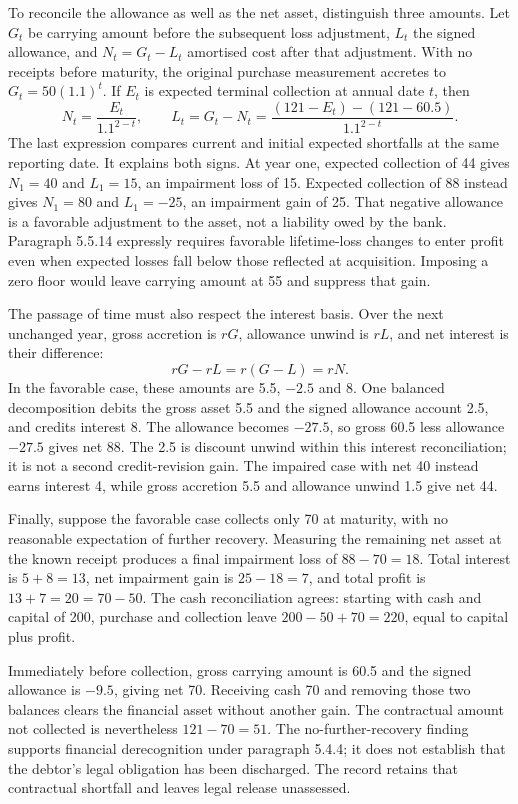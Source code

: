 To reconcile the allowance as well as the net asset, distinguish three
amounts. Let \(G_t\) be carrying amount before the subsequent loss
adjustment, \(L_t\) the signed allowance, and \(N_t=G_t-L_t\) amortised
cost after that adjustment. With no receipts before maturity, the original
purchase measurement accretes to \(G_t=50(1.1)^t\). If \(E_t\) is
expected terminal collection at annual date \(t\), then
\[
 N_t=\frac{E_t}{1.1^{2-t}},\qquad
 L_t=G_t-N_t
     =\frac{(121-E_t)-(121-60.5)}{1.1^{2-t}}.
\]
The last expression compares current and initial expected shortfalls at
the same reporting date. It explains both signs. At year one, expected
collection of 44 gives \(N_1=40\) and \(L_1=15\), an impairment loss
of 15. Expected collection of 88 instead gives \(N_1=80\) and
\(L_1=-25\), an impairment gain of 25. That negative allowance is a
favorable adjustment to the asset, not a liability owed by the bank.
Paragraph 5.5.14 expressly requires favorable lifetime-loss changes to enter
profit even when expected losses fall below those reflected at acquisition.
Imposing a zero floor would leave carrying amount at 55 and suppress that gain.

The passage of time must also respect the interest basis. Over the next
unchanged year, gross accretion is \(rG\), allowance unwind is \(rL\),
and net interest is their difference:
\[
 rG-rL=r(G-L)=rN.
\]
In the favorable case, these amounts are 5.5, \(-2.5\) and 8.
One balanced decomposition debits the gross asset 5.5 and the signed
allowance account 2.5, and credits interest 8. The allowance becomes
\(-27.5\), so gross 60.5 less allowance \(-27.5\) gives net 88.
The 2.5 is discount unwind within this interest reconciliation; it is not
a second credit-revision gain. The impaired case with net 40 instead earns
interest 4, while gross accretion 5.5 and allowance unwind 1.5 give net 44.

Finally, suppose the favorable case collects only 70 at maturity, with no
reasonable expectation of further recovery. Measuring the remaining net asset
at the known receipt produces a final impairment loss of \(88-70=18\).
Total interest is \(5+8=13\), net impairment gain is \(25-18=7\),
and total profit is \(13+7=20=70-50\). The cash reconciliation agrees:
starting with cash and capital of 200, purchase and collection leave
\(200-50+70=220\), equal to capital plus profit.

Immediately before collection, gross carrying amount is 60.5 and the
signed allowance is \(-9.5\), giving net 70. Receiving cash 70 and
removing those two balances clears the financial asset without another
gain. The contractual amount not collected is nevertheless \(121-70=51\).
The no-further-recovery finding supports financial derecognition under
paragraph 5.4.4; it does not establish that the debtor's legal obligation
has been discharged. The record retains that contractual shortfall and
leaves legal release unassessed.


